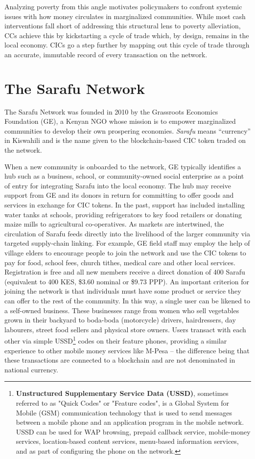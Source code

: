 \documentclass[12pt]{article}
\begin{document}
Analyzing poverty from this angle motivates policymakers to confront systemic issues with how money circulates in marginalized communities. While most cash interventions fall short of addressing this structural lens to poverty alleviation, CCs achieve this by kickstarting a cycle of trade which, by design, remains in the local economy. CICs go a step further by mapping out this cycle of trade through an accurate, immutable record of every transaction on the network.


\section{The Sarafu Network} \label{sec:section4}
The Sarafu Network was founded in 2010 by the Grassroots Economics Foundation (GE), a Kenyan NGO whose mission is to empower marginalized communities to develop their own prospering economies. \textit{Sarafu} means “currency” in Kiswahili and is the name given to the blockchain-based CIC token traded on the network.

When a new community is onboarded to the network, GE typically identifies a hub such as a business, school, or community-owned social enterprise as a point of entry for integrating Sarafu into the local economy. The hub may receive support from GE and its donors in return for committing to offer goods and services in exchange for CIC tokens. In the past, support has included installing water tanks at schools, providing refrigerators to key food retailers or donating maize mills to agricultural co-operatives. As markets are intertwined, the circulation of Sarafu feeds directly into the livelihood of the larger community via targeted supply-chain linking. For example, GE field staff may employ the help of village elders to encourage people to join the network and use the CIC tokens to pay for food, school fees, church tithes, medical care and other local services. Registration is free and all new members receive a direct donation of 400 Sarafu (equivalent to 400 KES, \$3.60 nominal or \$9.73 PPP). An important criterion for joining the network is that individuals must have some product or service they can offer to the rest of the community. In this way, a single user can be likened to a self-owned business. These businesses range from women who sell vegetables grown in their backyard to boda-boda (motorcycle) drivers, hairdressers, day labourers, street food sellers and physical store owners. Users transact with each other via simple USSD\footnote{\textbf{Unstructured Supplementary Service Data (USSD)}, sometimes referred to as "Quick Codes" or "Feature codes", is a Global System for Mobile (GSM) communication technology that is used to send messages between a mobile phone and an application program in the mobile network. USSD can be used for WAP browsing, prepaid callback service, mobile-money services, location-based content services, menu-based information services, and as part of configuring the phone on the network.} codes on their feature phones, providing a similar experience to other mobile money services like M-Pesa – the difference being that these transactions are connected to a blockchain and are not denominated in national currency.
\end{document}
